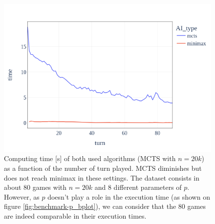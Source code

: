 \begin{figure}[ht]
    \centering
    \includegraphics[width=\linewidth]{plots/AvgTime_n20000.png}
    \caption{Computing time [s] of both used algorithms (MCTS with $n=20k$) as a function of the number of turn played. MCTS diminishes but does not reach minimax in these settings. The dataset consists in about 80 games with $n=20k$ and 8 different parameters of $p$. However, as $p$ doesn't play a role in the execution time (as shown on figure \ref{fig:benchmark-p_bplot}), we can consider that the 80 games are indeed comparable in their execution times.}
    \label{fig:benchmark-time_turn}
\end{figure}

